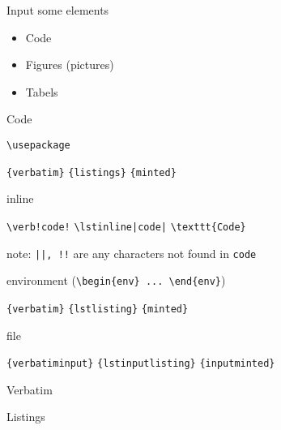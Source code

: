 \graphicspath{{sec03/images/s3/}{sec03/code/s3/}}
\lstset{inputpath=sec03/code/s3/}

\begin{frame}[fragile]{Input some elements}\relax
\begin{itemize}
     \item Code 
     \item Figures (pictures)
     \item Tabels
\end{itemize}
\end{frame}

\begin{frame}[fragile]{Code}\relax

\verb|\usepackage|

\hspace{\fill} \verb|{verbatim}| \hfill \verb|{listings}| \hfill \verb|{minted}|

inline

\hspace{\fill} \verb|\verb!code!| \hfill \verb!\lstinline|code|! \hfill \verb|\texttt{Code}|

{\csk \small note: \verb"||, !!" are any characters not found in \verb|code|}

environment (\verb|\begin{env} ... \end{env}|)

\hspace{\fill} \verb|{verbatim}| \hfill \verb|{lstlisting}| \hfill \verb|{minted}|

file

\hspace{\fill} \verb|{verbatiminput}| \hfill \verb|{lstinputlisting}| \hfill \verb|{inputminted}|

\end{frame}

\begin{frame}[fragile]{Verbatim}\relax

\cprotect{}
\end{frame}

\begin{frame}[fragile]{Listings}\relax

\cprotect{}
\end{frame}

